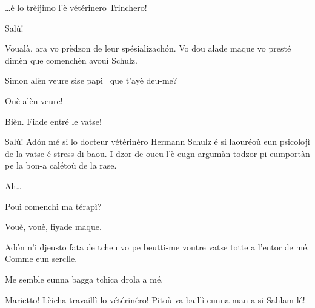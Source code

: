 \begin{drama}

\Chefspeaks \ldots é lo trèijimo l'è vétérinero Trinchero!


\Trincherospeaks {} Salù!


\Chefspeaks Voualà, ara vo prèdzon de leur spésializach\'on. Vo dou  alade maque vo presté dimèn que comenchèn avouì Schulz.


\Chefspeaks Simon alèn veure sise papì \documenti\ que t'ayè deu-me?

\Simonspeaks Ouè alèn veure!

\Chefspeaks Bièn.  Fiade entré le vatse!




\Schulzspeaks {} Salù! Ad\'on mé si lo docteur vétérinéro Hermann Schulz é si laouréoù eun psicolojì de la vatse é stress di baou. I dzor de oueu l'è eugn argumàn todzor pi eumportàn pe la bon-a calétoù de la rase.

\Cienspeaks Ah\ldots

\Schulzspeaks Pouì comenchì ma térapì?

\Cienspeaks Vouè, vouè, fiyade maque.

\Schulzspeaks Ad\'on n’i djeusto fata de tcheu vo pe beutti-me voutre vatse totte a l'entor de mé. Comme eun serclle.

\Mariettospeaks {} Me semble eunna bagga tchica drola a mé.

\Cienspeaks Marietto! Lèicha travaillì lo vétérinéro! Pitoù va baillì eun\-na man a si Sahlam lé!



\end{drama}
